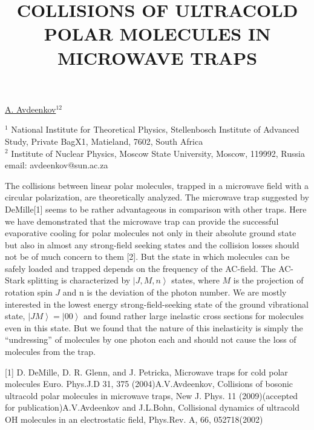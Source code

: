 \title{COLLISIONS OF ULTRACOLD POLAR MOLECULES IN MICROWAVE TRAPS}

\underline{A. Avdeenkov}$^{12}$


$^1$ National Institute for Theoretical Physics, Stellenbosch Institute of Advanced Study, Private BagX1, Matieland, 7602, South Africa\\
$^2$ Institute of Nuclear Physics, Moscow State University, Moscow, 119992, Russia\\
email: avdeenkov@sun.ac.za

The collisions between linear polar molecules, trapped in a microwave field with a circular polarization, are theoretically analyzed. The microwave trap suggested by DeMille[1] seems to be rather advantageous in comparison with other traps. Here we have demonstrated that the microwave trap can provide the successful evaporative cooling for polar molecules not only in their absolute ground state but also in almost any strong-field seeking states and the collision losses should not be of much concern to them [2]. But the state in which molecules can be safely loaded and trapped depends on the frequency of the AC-field. The AC-Stark splitting is characterized by $\left|J,M,n\right>$ states, where $M$ is the projection of rotation spin $J$ and n is the deviation of the photon number. We are mostly interested in the lowest energy strong-field-seeking state of the ground vibrational state, $\left|JM\right>= \left|00\right>$ and found rather large inelastic cross sections for molecules even in this state. But we found that the nature of this inelasticity is simply the ``undressing'' of molecules by one photon each and should not cause the loss of molecules from the trap.

[1] D. DeMille, D. R. Glenn, and J. Petricka, Microwave traps for cold polar molecules Euro. Phys.J.D 31, 375 (2004)\newline
[2] A.V.Avdeenkov, Collisions of bosonic ultracold polar molecules in microwave traps, New J. Phys. 11 (2009)(accepted for publication)\newline
[3] A.V.Avdeenkov and J.L.Bohn, Collisional dynamics of ultracold OH molecules in an electrostatic field, Phys.Rev. A, 66, 052718(2002)

\vspace{\baselineskip}